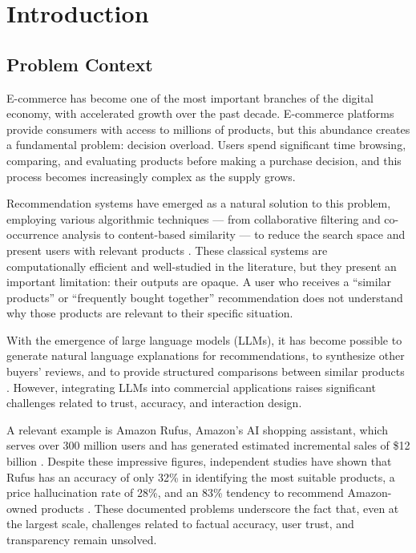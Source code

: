 \chapter{Introduction}
\label{chap:intro}

\section{Problem Context}
\label{sec:intro-context}

\par E-commerce has become one of the most important branches of the digital economy, with accelerated growth over the past decade. E-commerce platforms provide consumers with access to millions of products, but this abundance creates a fundamental problem: decision overload. Users spend significant time browsing, comparing, and evaluating products before making a purchase decision, and this process becomes increasingly complex as the supply grows.

\par Recommendation systems have emerged as a natural solution to this problem, employing various algorithmic techniques --- from collaborative filtering and co-occurrence analysis to content-based similarity --- to reduce the search space and present users with relevant products \cite{LLM4Rec2025, ComprehensiveRecSys2024}. These classical systems are computationally efficient and well-studied in the literature, but they present an important limitation: their outputs are opaque. A user who receives a ``similar products'' or ``frequently bought together'' recommendation does not understand why those products are relevant to their specific situation.

\par With the emergence of large language models (LLMs), it has become possible to generate natural language explanations for recommendations, to synthesize other buyers' reviews, and to provide structured comparisons between similar products \cite{LLMEnhancedRecSys2024, ExplainableRecKG2024}. However, integrating LLMs into commercial applications raises significant challenges related to trust, accuracy, and interaction design.

\par A relevant example is Amazon Rufus, Amazon's AI shopping assistant, which serves over 300 million users and has generated estimated incremental sales of \$12 billion \cite{RufusRevenue2025}. Despite these impressive figures, independent studies have shown that Rufus has an accuracy of only 32\% in identifying the most suitable products, a price hallucination rate of 28\%, and an 83\% tendency to recommend Amazon-owned products \cite{RufusWrong2024, RufusConfidentlyWrong2024}. These documented problems underscore the fact that, even at the largest scale, challenges related to factual accuracy, user trust, and transparency remain unsolved.

